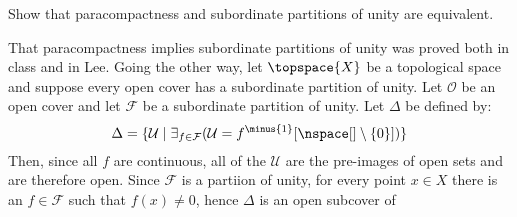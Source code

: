 \documentclass{article}                                                        %
\begin{document}
        \begin{problem}
            Show that paracompactness and subordinate partitions of unity are
            equivalent.
        \end{problem}
        \begin{solution}
            That paracompactness implies subordinate partitions of unity was
            proved both in class and in Lee. Going the other way, let
            $\topspace{X}$ be a topological space and suppose every
            open cover has a subordinate partition of unity. Let $\mathcal{O}$
            be an open cover and let $\mathcal{F}$ be a subordinate partition of
            unity. Let $\Delta$ be defined by:
            \begin{equation}
                \Delta=\{\mathcal{U}\;|\;\exists_{f\in\mathcal{F}}
                (\mathcal{U}=f^{\minus{1}}[\nspace[]\setminus\{0\}])\}
            \end{equation}
            Then, since all $f$ are continuous, all of the $\mathcal{U}$ are the
            pre-images of open sets and are therefore open. Since $\mathcal{F}$
            is a partiion of unity, for every point $x\in{X}$ there is an
            $f\in\mathcal{F}$ such that $f(x)\ne{0}$, hence $\Delta$ is an open
            subcover of
        \end{solution}
\end{document}
